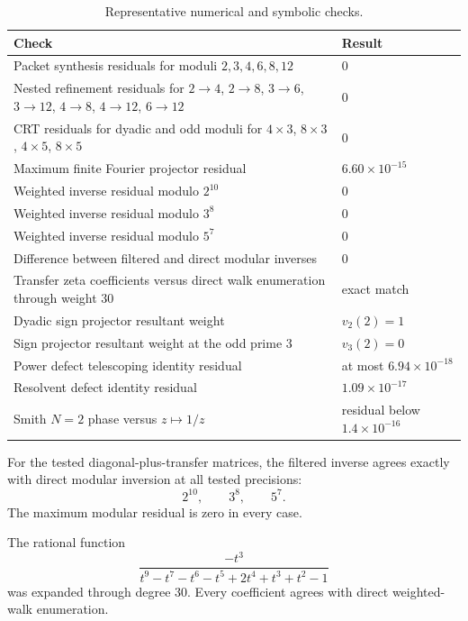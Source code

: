 \begin{table}[htbp]
\centering
\caption{Representative numerical and symbolic checks.}
\begin{tabularx}{\textwidth}{L{0.54\textwidth}Y}
\toprule
Check & Result \\
\midrule
Packet synthesis residuals for moduli $2,3,4,6,8,12$ & $0$ \\
Nested refinement residuals for $2\to4$, $2\to8$, $3\to6$, $3\to12$, $4\to8$, $4\to12$, $6\to12$ & $0$ \\
CRT residuals for dyadic and odd moduli for $4\times3$, $8\times3$, $4\times5$, $8\times5$ & $0$ \\
Maximum finite Fourier projector residual & $6.60\times10^{-15}$ \\
Weighted inverse residual modulo $2^{10}$ & $0$ \\
Weighted inverse residual modulo $3^8$ & $0$ \\
Weighted inverse residual modulo $5^7$ & $0$ \\
Difference between filtered and direct modular inverses & $0$ \\
Transfer zeta coefficients versus direct walk enumeration through weight $30$ & exact match \\
Dyadic sign projector resultant weight & $v_2(2)=1$ \\
Sign projector resultant weight at the odd prime $3$ & $v_3(2)=0$ \\
Power defect telescoping identity residual & at most $6.94\times10^{-18}$ \\
Resolvent defect identity residual & $1.09\times10^{-17}$ \\
Smith $N=2$ phase versus $z\mapsto1/z$ & residual below $1.4\times10^{-16}$ \\
\bottomrule
\end{tabularx}
\end{table}

\begin{certificate}
For the tested diagonal-plus-transfer matrices, the filtered inverse agrees exactly with direct modular inversion at all tested precisions:
\[
2^{10},\qquad3^8,\qquad5^7.
\]
The maximum modular residual is zero in every case.
\end{certificate}

\begin{certificate}
The rational function
\[
\frac{-t^3}{t^9-t^7-t^6-t^5+2t^4+t^3+t^2-1}
\]
was expanded through degree $30$. Every coefficient agrees with direct weighted-walk enumeration.
\end{certificate}

